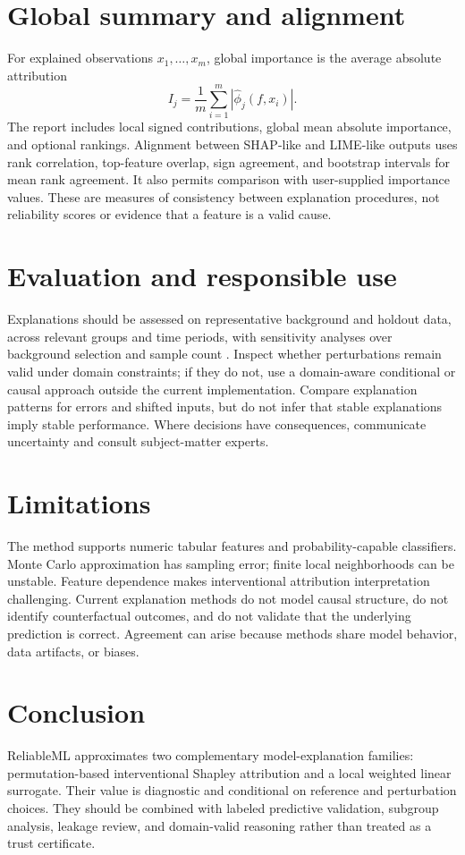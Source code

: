 \documentclass[conference]{IEEEtran}
\begin{document}
\section{Global summary and alignment}
For explained observations \(x_1,\ldots,x_m\), global importance is the average absolute attribution
\[
I_j=\frac1m\sum_{i=1}^m|\hat\phi_j(f,x_i)|.
\]
The report includes local signed contributions, global mean absolute importance, and optional rankings. Alignment between SHAP-like and LIME-like outputs uses rank correlation, top-feature overlap, sign agreement, and bootstrap intervals for mean rank agreement. It also permits comparison with user-supplied importance values. These are measures of consistency between explanation procedures, not reliability scores or evidence that a feature is a valid cause.

\section{Evaluation and responsible use}
Explanations should be assessed on representative background and holdout data, across relevant groups and time periods, with sensitivity analyses over background selection and sample count \cite{molnar}. Inspect whether perturbations remain valid under domain constraints; if they do not, use a domain-aware conditional or causal approach outside the current implementation. Compare explanation patterns for errors and shifted inputs, but do not infer that stable explanations imply stable performance. Where decisions have consequences, communicate uncertainty and consult subject-matter experts.

\section{Limitations}
The method supports numeric tabular features and probability-capable classifiers. Monte Carlo approximation has sampling error; finite local neighborhoods can be unstable. Feature dependence makes interventional attribution interpretation challenging. Current explanation methods do not model causal structure, do not identify counterfactual outcomes, and do not validate that the underlying prediction is correct. Agreement can arise because methods share model behavior, data artifacts, or biases.

\section{Conclusion}
ReliableML approximates two complementary model-explanation families: permutation-based interventional Shapley attribution and a local weighted linear surrogate. Their value is diagnostic and conditional on reference and perturbation choices. They should be combined with labeled predictive validation, subgroup analysis, leakage review, and domain-valid reasoning rather than treated as a trust certificate.
\end{document}
